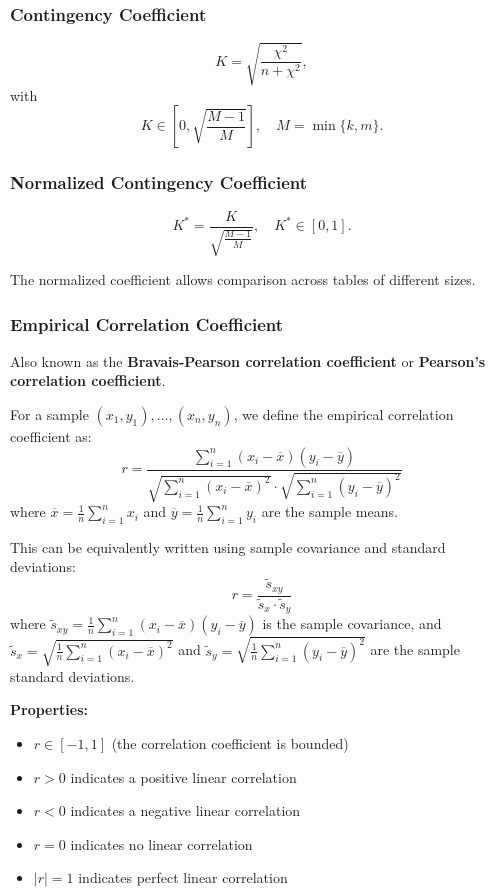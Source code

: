 \documentclass{article}
\begin{document}
\subsubsection{Contingency Coefficient}
\[
K = \sqrt{\frac{\chi^2}{n + \chi^2}},
\]
with
\[
K \in \left[0, \sqrt{\frac{M-1}{M}}\right], 
\quad M = \min\{k,m\}.
\]

\subsubsection{Normalized Contingency Coefficient}
\[
K^* = \frac{K}{\sqrt{\frac{M-1}{M}}}, \quad K^* \in [0,1].
\]

The normalized coefficient allows comparison across tables of different sizes.

\subsubsection{Empirical Correlation Coefficient}

Also known as the \textbf{Bravais-Pearson correlation coefficient} or \textbf{Pearson's correlation coefficient}.

For a sample $(x_1, y_1), \ldots, (x_n, y_n)$, we define the empirical correlation coefficient as:
\[
r = \frac{\sum_{i=1}^{n}(x_i - \overline{x})(y_i - \overline{y})}{\sqrt{\sum_{i=1}^{n}(x_i - \overline{x})^2} \cdot \sqrt{\sum_{i=1}^{n}(y_i - \overline{y})^2}}
\]
where $\overline{x} = \frac{1}{n}\sum_{i=1}^{n}x_i$ and $\overline{y} = \frac{1}{n}\sum_{i=1}^{n}y_i$ are the sample means.

This can be equivalently written using sample covariance and standard deviations:
\[
r = \frac{\tilde{s}_{xy}}{\tilde{s}_x \cdot \tilde{s}_y}
\]
where $\tilde{s}_{xy} = \frac{1}{n}\sum_{i=1}^{n}(x_i - \overline{x})(y_i - \overline{y})$ is the sample covariance, and $\tilde{s}_x = \sqrt{\frac{1}{n}\sum_{i=1}^{n}(x_i - \overline{x})^2}$ and $\tilde{s}_y = \sqrt{\frac{1}{n}\sum_{i=1}^{n}(y_i - \overline{y})^2}$ are the sample standard deviations.

\textbf{Properties:}
\begin{itemize}
    \item $r \in [-1, 1]$ (the correlation coefficient is bounded)
    \item $r > 0$ indicates a positive linear correlation
    \item $r < 0$ indicates a negative linear correlation
    \item $r = 0$ indicates no linear correlation
    \item $|r| = 1$ indicates perfect linear correlation
\end{itemize}
\end{document}
